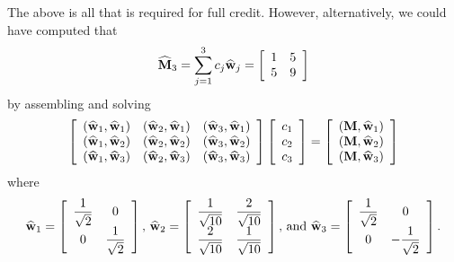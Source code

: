 \begin{solution}
\begin{enumerate}
The above is all that is required for full credit. However, alternatively, we could have computed that
\[
\widehat{{\bf M}}_3=\sum_{j=1}^3c_j\widehat{{\bf w}}_j=\left[\begin{array}{cc}1 & 5 \\ 5 & 9\end{array}\right]
\]
by assembling and solving
\[
\left[\begin{array}{ccc} \left(\widehat{{\bf w}}_1,\widehat{{\bf w}}_1\right) & \left(\widehat{{\bf w}}_2,\widehat{{\bf w}}_1\right) & \left(\widehat{{\bf w}}_3,\widehat{{\bf w}}_1\right)
\\
\left(\widehat{{\bf w}}_1,\widehat{{\bf w}}_2\right) & \left(\widehat{{\bf w}}_2,\widehat{{\bf w}}_2\right) & \left(\widehat{{\bf w}}_3,\widehat{{\bf w}}_2\right)
\\
\left(\widehat{{\bf w}}_1,\widehat{{\bf w}}_3\right) & \left(\widehat{{\bf w}}_2,\widehat{{\bf w}}_3\right) & \left(\widehat{{\bf w}}_3,\widehat{{\bf w}}_3\right)\end{array}\right]\left[\begin{array}{c}c_1 \\ c_2 \\ c_3\end{array}\right]=\left[\begin{array}{c}\left({\bf M},\widehat{{\bf w}}_1\right) \\ \left({\bf M},\widehat{{\bf w}}_2\right) \\ \left({\bf M},\widehat{{\bf w}}_3\right)\end{array}\right]
\]
where
\[
\widehat{{\bf w}}_1=\left[\begin{array}{cc}\displaystyle{{1\over\sqrt{2}}}  & 0 \\ 0 & \displaystyle{{1\over \sqrt{2}}}\end{array}\right]\mbox{, }\widehat{{\bf w}}_2=\left[\begin{array}{cc}\displaystyle{{1\over\sqrt{10}}} & \displaystyle{{2\over\sqrt{10}}} \\ \displaystyle{{2\over\sqrt{10}}} & \displaystyle{{1\over \sqrt{10}}}\end{array}\right]\mbox{, and }\widehat{{\bf w}}_3=\left[\begin{array}{cc}\displaystyle{{1\over\sqrt{2}}} & 0 \\ 0 & \displaystyle{-{1\over\sqrt{2}}}\end{array}\right].
\]
\end{enumerate} 
\end{solution}